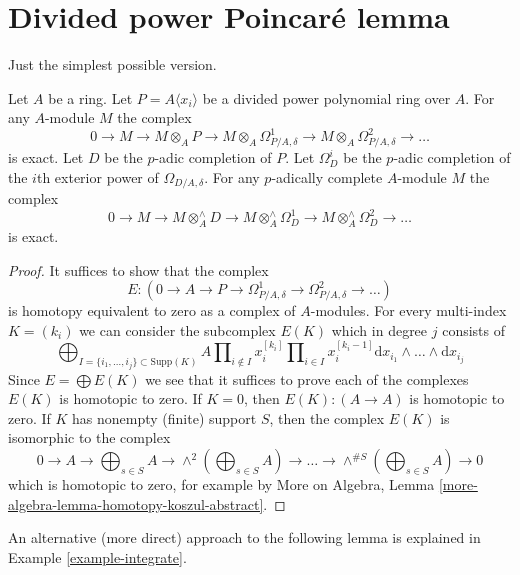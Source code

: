 \section{Divided power Poincar\'e lemma}
\label{section-poincare}

\noindent
Just the simplest possible version.

\begin{lemma}
\label{lemma-poincare}
Let $A$ be a ring. Let $P = A\langle x_i \rangle$ be a divided
power polynomial ring over $A$. For any $A$-module $M$ the complex
$$
0 \to M \to
M \otimes_A P \to
M \otimes_A \Omega^1_{P/A, \delta} \to
M \otimes_A \Omega^2_{P/A, \delta} \to \ldots
$$
is exact. Let $D$ be the $p$-adic completion of $P$.
Let $\Omega^i_D$ be the $p$-adic completion of the $i$th exterior
power of $\Omega_{D/A, \delta}$. For any $p$-adically complete
$A$-module $M$ the complex
$$
0 \to M \to
M \otimes^\wedge_A D \to
M \otimes^\wedge_A \Omega^1_D \to
M \otimes^\wedge_A \Omega^2_D \to \ldots
$$
is exact.
\end{lemma}

\begin{proof}
It suffices to show that the complex
$$
E :
(0 \to A \to P \to \Omega^1_{P/A, \delta} \to
\Omega^2_{P/A, \delta} \to \ldots)
$$
is homotopy equivalent to zero as a complex of $A$-modules.
For every multi-index $K = (k_i)$ we can consider the subcomplex $E(K)$
which in degree $j$ consists of
$$
\bigoplus\nolimits_{I = \{i_1, \ldots, i_j\} \subset \text{Supp}(K)}
A
\prod\nolimits_{i \not \in I} x_i^{[k_i]}
\prod\nolimits_{i \in I} x_i^{[k_i - 1]}
\text{d}x_{i_1} \wedge \ldots \wedge \text{d}x_{i_j}
$$
Since $E = \bigoplus E(K)$ we see that it suffices to prove each of the
complexes $E(K)$ is homotopic to zero. If $K = 0$, then
$E(K) : (A \to A)$ is homotopic to zero. If $K$ has nonempty (finite)
support $S$, then the complex $E(K)$ is isomorphic to the complex
$$
0 \to A \to
\bigoplus\nolimits_{s \in S} A \to
\wedge^2(\bigoplus\nolimits_{s \in S} A) \to
\ldots \to \wedge^{\# S}(\bigoplus\nolimits_{s \in S} A) \to 0
$$
which is homotopic to zero, for example by
More on Algebra, Lemma \ref{more-algebra-lemma-homotopy-koszul-abstract}.
\end{proof}

\noindent
An alternative (more direct) approach to the following lemma is
explained in Example \ref{example-integrate}.

